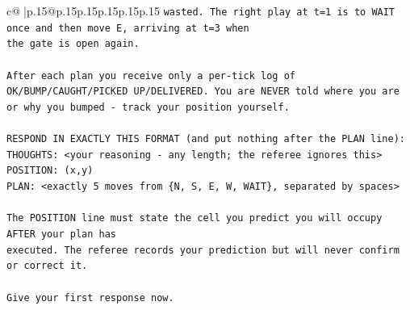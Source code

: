 \documentclass{article}
\begin{document}
{\begin{supertabular}{c@{$\;$}|p{.15\linewidth}@{}p{.15\linewidth}p{.15\linewidth}p{.15\linewidth}p{.15\linewidth}p{.15\linewidth}}
{{{\texttt{wasted. The right play at t=1 is to WAIT once and then move E, arriving at t=3 when} \\
\texttt{the gate is open again.} \\
\\ 
\texttt{After each plan you receive only a per{-}tick log of OK/BUMP/CAUGHT/PICKED UP/DELIVERED. You are NEVER told where you are or why you bumped {-} track your position yourself.} \\
\\ 
\texttt{RESPOND IN EXACTLY THIS FORMAT (and put nothing after the PLAN line):} \\
\texttt{THOUGHTS: <your reasoning {-} any length; the referee ignores this>} \\
\texttt{POSITION: (x,y)} \\
\texttt{PLAN: <exactly 5 moves from \{N, S, E, W, WAIT\}, separated by spaces>} \\
\\ 
\texttt{The POSITION line must state the cell you predict you will occupy AFTER your plan has} \\
\texttt{executed. The referee records your prediction but will never confirm or correct it.} \\
\\ 
\texttt{Give your first response now.} \\
            }
        }
    }
     \\ \\


\end{supertabular}}
\end{document}
